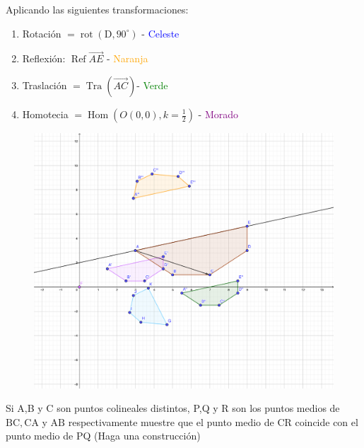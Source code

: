 \begin{sol}
	Aplicando las siguientes transformaciones: 
		\begin{enumerate}
		\item Rotación $=\operatorname{rot}\left(\mathrm{D}, 90^{\circ}\right)$ - \textcolor{blue}{Celeste}
		\item Reflexión: $\operatorname{Ref} \overrightarrow{A E}$ - \textcolor{orange}{Naranja}
		\item Traslación $=\operatorname{Tra}(\overrightarrow{A C})$- \textcolor{green}{Verde}
		\item Homotecia $=\operatorname{Hom}\left(O(0,0), k=\frac{1}{2}\right)$ - \textcolor{purple}{Morado}
	\end{enumerate}
	\begin{figure}[H]
		\centering
		\includegraphics[scale=1]{Images/P3-1.png}
	\end{figure}
\end{sol}
\begin{problema}
	Si A,B y C son puntos colineales distintos, P,Q y R son los puntos medios de $\mathrm{BC}, \mathrm{CA}$ y $\mathrm{AB}$ respectivamente muestre que el punto medio de CR coincide con el punto medio de PQ (Haga una construcción)
\end{problema}
